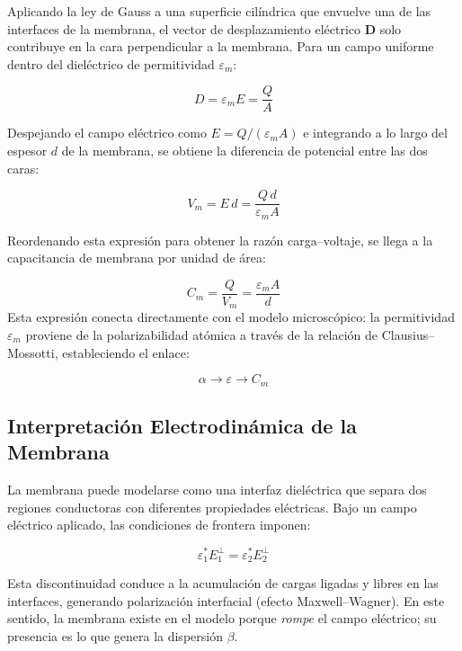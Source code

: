 \documentclass[12pt]{article}
\begin{document}
Aplicando la ley de Gauss a una superficie cilíndrica que envuelve una de las
interfaces de la membrana, el vector de desplazamiento el\'ectrico $\mathbf{D}$
solo contribuye en la cara perpendicular a la membrana. Para un campo uniforme
dentro del diel\'ectrico de permitividad $\varepsilon_m$:

\begin{equation}
D = \varepsilon_m E = \frac{Q}{A}
\end{equation}

Despejando el campo el\'ectrico como $E = Q/(\varepsilon_m A)$ e integrando a lo
largo del espesor $d$ de la membrana, se obtiene la diferencia de potencial
entre las dos caras:

\begin{equation}
V_m = E\,d = \frac{Q\,d}{\varepsilon_m A}
\end{equation}

Reordenando esta expresi\'on para obtener la raz\'on carga--voltaje, se llega a la
capacitancia de membrana por unidad de \'area:

\begin{equation}
\boxed{C_m = \frac{Q}{V_m} = \frac{\varepsilon_m A}{d}}
\end{equation}
Esta expresi\'on conecta directamente con el modelo microsc\'opico: la permitividad
$\varepsilon_m$ proviene de la polarizabilidad at\'omica a trav\'es de la relaci\'on de
Clausius--Mossotti, estableciendo el enlace:

\begin{equation}
\alpha \rightarrow \varepsilon \rightarrow C_m
\end{equation}

\subsection{Interpretaci\'on Electrodin\'amica de la Membrana}

La membrana puede modelarse como una interfaz diel\'ectrica que separa dos regiones
conductoras con diferentes propiedades el\'ectricas. Bajo un campo el\'ectrico aplicado, las
condiciones de
frontera imponen:

\begin{equation}
\varepsilon_1^* E_1^\perp = \varepsilon_2^* E_2^\perp
\end{equation}

Esta discontinuidad conduce a la acumulaci\'on de cargas ligadas y libres en las interfaces,
generando polarizaci\'on interfacial (efecto Maxwell--Wagner). En este sentido, la membrana
existe en el modelo porque \emph{rompe} el campo el\'ectrico; su presencia es lo que genera
la dispersi\'on $\beta$.
\end{document}
